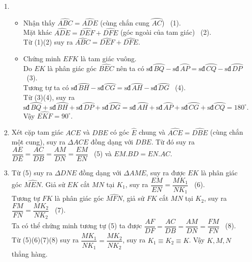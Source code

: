 \begin{bt}
{\begin{center}
		\end{center}
		\begin{enumerate}
			\item 
			\begin{itemize}
				\item Nhận thấy $\widehat{ABC}=\widehat{ADE}$ (cùng chắn cung $\wideparen{AC}$) \ (1).\\
				Mặt khác $\widehat{ADE}=\widehat{DEF}+\widehat{DFE}$ (góc ngoài của tam giác) \ (2).\\
				Từ (1)(2) suy ra $\widehat{ABC}=\widehat{DEF}+\widehat{DFE}$.
				\item Chứng minh $EFK$ là tam giác vuông.\\
				Do $EK$ là phân giác góc $\widehat{BEC}$ nên ta có $\mbox{sđ}\,\wideparen{BQ}-\mbox{sđ}\,\wideparen{AP}=\mbox{sđ}\,\wideparen{CQ}-\mbox{sđ}\,\wideparen{DP}$ \ (3).\\
				Tương tự ta có $\mbox{sđ}\,\wideparen{BH}-\mbox{sđ}\,\wideparen{CG}=\mbox{sđ}\,\wideparen{AH}-\mbox{sđ}\,\wideparen{DG}$ \ (4).\\
				Từ (3)(4), suy ra $$\mbox{sđ}\,\wideparen{BQ}+\mbox{sđ}\,\wideparen{BH}+\mbox{sđ}\,\wideparen{DP}+\mbox{sđ}\,\wideparen{DG}=\mbox{sđ}\,\wideparen{AH}+\mbox{sđ}\,\wideparen{AP}+\mbox{sđ}\,\wideparen{CG}+\mbox{sđ}\,\wideparen{CQ}=180^\circ.$$
				Vậy $\widehat{EKF}=90^\circ$.
			\end{itemize}
			\item Xét cặp tam giác $ACE$ và $DBE$ có góc $\widehat{E}$ chung và $\widehat{ACE}=\widehat{DBE}$ (cùng chắn một cung), suy ra $\Delta ACE$ đồng dạng với $DBE$. Từ đó suy ra $\dfrac{AE}{DE}=\dfrac{AC}{DB}=\dfrac{AM}{DN}=\dfrac{EM}{EN}$ \ (5) và $EM.BD=EN.AC$.
			\item Từ (5) suy ra $\Delta DNE$ đồng dạng với $\Delta AME$, suy ra được $EK$ là phân giác góc $\widehat{MEN}$. Giả sử $EK$ cắt $MN$ tại $K_1$, suy ra $\dfrac{EM}{EN}=\dfrac{MK_1}{NK_1}$ \ (6). \\
			Tương tự $FK$ là phân giác góc $\widehat{MFN}$, giả sử $FK$ cắt $MN$ tại $K_2$, suy ra $\dfrac{FM}{FN}=\dfrac{MK_2}{NK_2}$ \ (7). \\
			Ta có thể chứng minh tương tự (5) ta được $\dfrac{AF}{DF}=\dfrac{AC}{DB}=\dfrac{AM}{DN}=\dfrac{FM}{FN}$ \ (8).\\
			Từ (5)(6)(7)(8) suy ra $\dfrac{MK_1}{NK_1}=\dfrac{MK_2}{NK_2}$, suy ra $K_1\equiv K_2\equiv K$. Vậy $K,M,N$ thẳng hàng.
		\end{enumerate}
	}
\end{bt}

